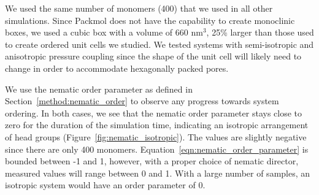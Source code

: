 \documentclass{article}
\begin{document}
  We used the same number of monomers (400) that we used in all other simulations. 
  Since Packmol does not have the capability to create monoclinic boxes, we used a cubic
  box with a volume of 660 nm$^3$, 25\% larger than those used to create ordered unit
  cells we studied. We tested systems with semi-isotropic and anisotropic pressure 
  coupling since the shape of the unit cell will likely need to change in order to 
  accommodate hexagonally packed pores.
  
  We use the nematic order parameter as defined in Section~\ref{method:nematic_order} to 
  observe any progress towards system ordering. In both cases, we see that the nematic
  order parameter stays close to zero for the duration of the simulation time, indicating
  an isotropic arrangement of head groups (Figure~\ref{fig:nematic_isotropic}). The values
  are slightly negative since there are only 400 monomers. 
  Equation~\ref{eqn:nematic_order_parameter} is bounded between -1 and 1, however, with a
  proper choice of nematic director, measured values will range between 0 and 1. With a 
  large number of samples, an isotropic system would have an order parameter of 0.
  
\end{document}
